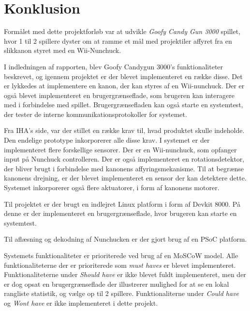 \chapter{Konklusion}
Formålet med dette projektforløb var at udvikle \textit{Goofy Candy Gun 3000} spillet, hvor 1 til 2 spillere dyster om at ramme et mål med projektiler affyret fra en slikkanon styret med en Wii-Nunchuck. \newline

\noindent I indledningen af rapporten, blev Goofy Candygun 3000's funktionaliteter beskrevet, og igennem projektet er der blevet implementeret en række disse. Det er lykkedes at implementere en kanon, der kan styres af en Wii-nunchuck. Der er også blevet implementeret en brugergrænseflade, som brugeren kan interagere med i forbindelse med spillet. Brugergrænsefladen kan også starte en systemtest, der tester de interne kommunikationsprotokoller for systemet.\newline

\noindent Fra IHA's side, var der stillet en række krav til, hvad produktet skulle indeholde. Den endelige prototype inkorporerer alle disse krav. I systemet er der implementeret flere forskellige sensorer. Der er en Wii-nunchuck, som opfanger input på Nunchuck controlleren. Der er også implementeret en rotationsdetektor, der bliver brugt i forbindelse med kanonens affyringsmekanisme. Til at begrænse kanonens drejning, er der blevet implementeret en sensor der kan detektere dette. Systemet inkorporerer også flere aktuatorer, i form af kanonens motorer.\newline

\noindent Til projektet er der brugt en indlejret Linux platform i form af Devkit 8000. På denne er der implementeret en brugergrænseflade, hvor brugeren kan starte en systemtest.\newline

\noindent Til aflæsning og dekodning af Nunchucken er der gjort brug af en PSoC platform. \newline

\noindent Systemets funktionaliteter er prioriterede ved brug af en MoSCoW model. Alle funktionaliteterne der er prioriterede som \textit{must haves} er blevet implementeret. Funktionaliteterne under \textit{Should have} er ikke blevet fuldt implementeret, men der er dog opsat en brugergrænseflade der illustrerer mulighed for at se en lokal rangliste statistik, og vælge op til 2 spillere. Funktionaliterne under \textit{Could have} og \textit{Wont have} er ikke implementeret i dette projekt.